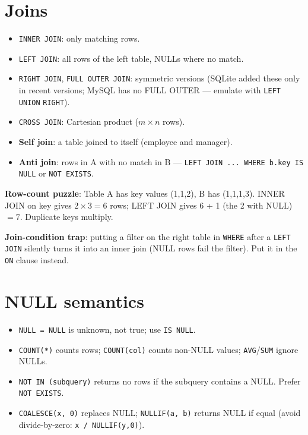 \section{Joins}
\begin{itemize}
  \item \texttt{INNER JOIN}: only matching rows.
  \item \texttt{LEFT JOIN}: all rows of the left table, NULLs where no match.
  \item \texttt{RIGHT JOIN}, \texttt{FULL OUTER JOIN}: symmetric versions (SQLite added these only in recent versions; MySQL has no FULL OUTER --- emulate with \texttt{LEFT} \texttt{UNION} \texttt{RIGHT}).
  \item \texttt{CROSS JOIN}: Cartesian product ($m\times n$ rows).
  \item \textbf{Self join}: a table joined to itself (employee and manager).
  \item \textbf{Anti join}: rows in A with no match in B --- \texttt{LEFT JOIN ... WHERE b.key IS NULL} or \texttt{NOT EXISTS}.
\end{itemize}
\textbf{Row-count puzzle}: Table A has key values (1,1,2), B has (1,1,1,3). INNER JOIN on key gives $2\times3=6$ rows; LEFT JOIN gives 6 + 1 (the 2 with NULL) $=7$. Duplicate keys multiply.

\textbf{Join-condition trap}: putting a filter on the right table in \texttt{WHERE} after a \texttt{LEFT JOIN} silently turns it into an inner join (NULL rows fail the filter). Put it in the \texttt{ON} clause instead.

\section{NULL semantics}
\begin{itemize}
  \item \texttt{NULL = NULL} is unknown, not true; use \texttt{IS NULL}.
  \item \texttt{COUNT(*)} counts rows; \texttt{COUNT(col)} counts non-NULL values; \texttt{AVG}/\texttt{SUM} ignore NULLs.
  \item \texttt{NOT IN (subquery)} returns no rows if the subquery contains a NULL. Prefer \texttt{NOT EXISTS}.
  \item \texttt{COALESCE(x, 0)} replaces NULL; \texttt{NULLIF(a, b)} returns NULL if equal (avoid divide-by-zero: \texttt{x / NULLIF(y,0)}).
\end{itemize}

